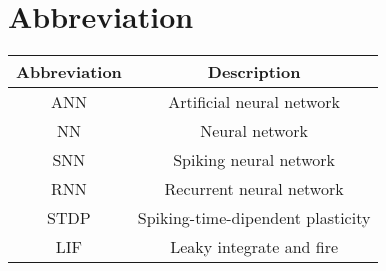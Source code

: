 \chapter*{\centering Abbreviation}%
\begin{center}
\end{center}
\begin{center}
    \begin{tabular}{ c c   }
        \hline
        Abbreviation & Description                       \\
        \hline
        ANN          & Artificial neural network         \\
        NN           & Neural network                    \\
        SNN          & Spiking neural network            \\
        RNN          & Recurrent neural network          \\
        STDP         & Spiking-time-dipendent plasticity \\
        LIF          & Leaky integrate and fire          \\

        \hline
    \end{tabular}
\end{center}